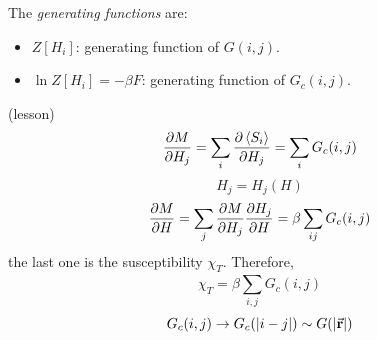 \documentclass[../main/main.tex]{subfiles}
\begin{document}
The \emph{generating functions} are:
\begin{itemize}
\item \( Z[H_i] \): generating function of \( G(i,j) \).
\item \( \ln{Z[H_i]} = - \beta F  \): generating function of \( G_c (i,j) \).
\end{itemize}

\begin{remark}
  (lesson)
  \begin{equation}
    \pdv{M}{H_j} = \sum_{i}^{} \pdv{\expval{S_i} }{H_j} = \sum_{i}^{} G_c (i,j)
  \end{equation}
  \begin{equation}
    H_j = H_j (H)
  \end{equation}
  \begin{equation}
    \pdv{M}{H} = \sum_{j}^{} \pdv{M}{H_j} \pdv{H_j}{H}
    =  \beta \sum_{ij}^{} G_c (i,j)
  \end{equation}
  the last one is the susceptibility \( \chi _T \).
   Therefore,
   \begin{equation}
     \chi _T = \beta \sum_{i,j}^{} G_c (i,j)
   \end{equation}
   \begin{equation}
     G_c (i,j) \rightarrow G_c (\abs{i-j} ) \sim G (\abs{\va{r}} )
   \end{equation}
\end{remark}
\end{document}
